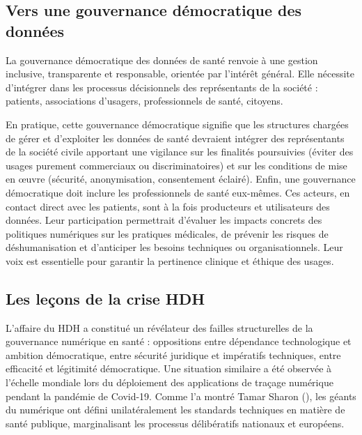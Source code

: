 \documentclass[10pt,a4paper]{article}
\begin{document}
\subsection{Vers une gouvernance démocratique des données}

La gouvernance démocratique des données de santé renvoie à une gestion inclusive, transparente et responsable, orientée par l'intérêt général. Elle nécessite d'intégrer dans les processus décisionnels des représentants de la société : patients, associations d'usagers, professionnels de santé, citoyens.

En pratique, cette gouvernance démocratique signifie que les structures chargées de gérer et d'exploiter les données de santé devraient intégrer des représentants de la société civile apportant une vigilance sur les finalités poursuivies (éviter des usages purement commerciaux ou discriminatoires) et sur les conditions de mise en œuvre (sécurité, anonymisation, consentement éclairé). Enfin, une gouvernance démocratique doit inclure les professionnels de santé eux-mêmes. Ces acteurs, en contact direct avec les patients, sont à la fois producteurs et utilisateurs des données. Leur participation permettrait d’évaluer les impacts concrets des politiques numériques sur les pratiques médicales, de prévenir les risques de déshumanisation et d’anticiper les besoins techniques ou organisationnels. Leur voix est essentielle pour garantir la pertinence clinique et éthique des usages.

\subsection{Les leçons de la crise HDH}

L’affaire du HDH a constitué un révélateur des failles structurelles de la gouvernance numérique en santé : oppositions entre dépendance technologique et ambition démocratique, entre sécurité juridique et impératifs techniques, entre efficacité et légitimité démocratique. Une situation similaire a été observée à l’échelle mondiale lors du déploiement des applications de traçage numérique pendant la pandémie de Covid-19. Comme l’a montré Tamar Sharon (\citeyear{sharon2021blind}), les géants du numérique ont défini unilatéralement les standards techniques \parencite{bar2014consumer} en matière de santé publique, marginalisant les processus délibératifs nationaux et européens.
\end{document}

